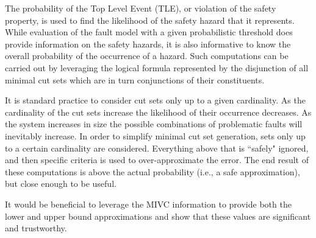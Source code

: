 The probability of the Top Level Event (TLE), or violation of the safety property, is used to find the likelihood of the safety hazard that it represents. While evaluation of the fault model with a given probabilistic threshold does provide information on the safety hazards, it is also informative to know the overall probability of the occurrence of a hazard. Such computations can be carried out by leveraging the logical formula represented by the disjunction of all minimal cut sets which are in turn conjunctions of their constituents. 

It is standard practice to consider cut sets only up to a given cardinality. As the cardinality of the cut sets increase the likelihood of their occurrence decreases. As the system increases in size the possible combinations of problematic faults will inevitably increase. In order to simplify minimal cut set generation, sets only up to a certain cardinality are considered. Everything above that is ``safely" ignored, and then specific criteria is used to over-approximate the error. The end result of these computations is above the actual probability (i.e., a safe approximation), but close enough to be useful. 


It would be beneficial to leverage the MIVC information to provide both the lower and upper bound approximations and show that these values are significant and trustworthy. 




